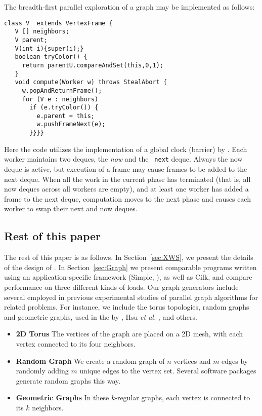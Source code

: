 \begin{example}[BFS] \label{example:bfs}
The breadth-first parallel exploration of a graph may be implemented
as follows:
{\footnotesize
\begin{verbatim}
class V  extends VertexFrame {
   V [] neighbors;
   V parent;
   V(int i){super(i);}
   boolean tryColor() {
     return parentU.compareAndSet(this,0,1);
   }
   void compute(Worker w) throws StealAbort {
     w.popAndReturnFrame();
     for (V e : neighbors) 
       if (e.tryColor()) {
         e.parent = this;
         w.pushFrameNext(e);
       }}}}
\end{verbatim}}

Here the code utilizes the implementation of a global clock (barrier)
by \XWS. Each worker maintains two deques, the {\em now} and the {\tt
next} deque. Always the now deque is active, but execution of a frame
may cause frames to be added to the next deque.  When all the work in
the current phase has terminated (that is, all now deques across all
workers are empty), and at least one worker has added a frame to the
next deque, computation moves to the next phase and causes each worker
to swap their next and now deques.
\end{example}

\subsection{Rest of this paper}

The rest of this paper is as follows. In Section~\ref{sec:XWS}, we
present the details of the design of \XWS. In Section~\ref{sec:Graph}
we present comparable programs written using an application-specific
framework (Simple, \cite{BC04a}), as well as Cilk, and compare
performance on three different kinds of loads.  Our graph generators
include several employed in previous experimental studies of parallel
graph algorithms for related problems. For instance, we include the
torus topologies, random graphs and geometric graphs, used in the
by \cite{Gre94}, Hsu \emph{et al.}  \cite{HRD97}, and others.

\begin{itemize}
\itemsep0pt
\item \textbf{2D Torus} The vertices of the graph are placed on a 2D
  mesh, with each vertex connected to its four neighbors.  

\item \textbf{Random Graph} We create a random graph of $n$ vertices
  and $m$ edges by randomly adding $m$ unique edges to the vertex
  set. Several software packages generate random graphs this way.
  
\item \textbf{Geometric Graphs} In these $k$-regular graphs,
  each vertex is connected to its $k$ %
  neighbors.  
\end{itemize}


